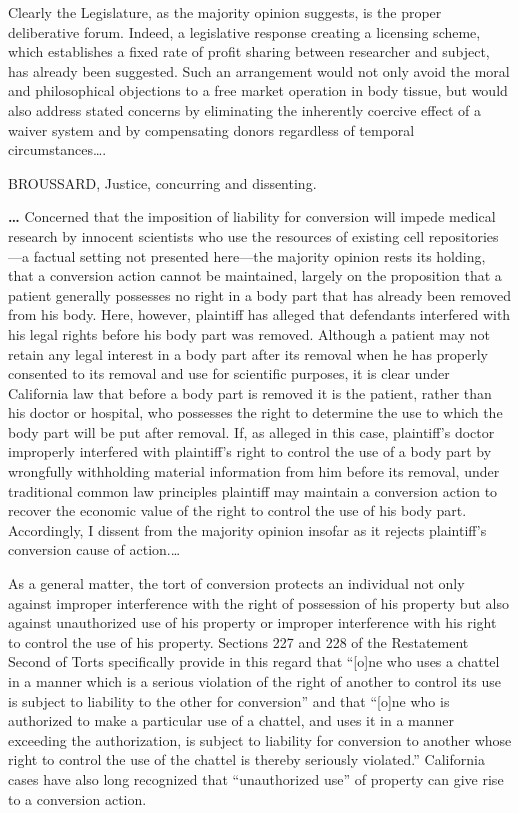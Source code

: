 Clearly the Legislature, as the majority opinion suggests, is the proper
deliberative forum. Indeed, a legislative response creating a licensing scheme,
which establishes a fixed rate of profit sharing between researcher and
subject, has already been suggested. Such an arrangement would not only avoid
the moral and philosophical objections to a free market operation in body
tissue, but would also address stated concerns by eliminating the inherently
coercive effect of a waiver system and by compensating donors regardless of
temporal circumstances{\dots}.

BROUSSARD, Justice, concurring and dissenting.

\textbf{{\dots} }Concerned that the imposition of liability for conversion will
impede medical research by innocent scientists who use the resources of
existing cell repositories---a factual setting not presented here---the
majority opinion rests its holding, that a conversion action cannot be
maintained, largely on the proposition that a patient generally possesses no
right in a body part that has already been removed from his body. Here,
however, plaintiff has alleged that defendants interfered with his legal rights
before his body part was removed. Although a patient may not retain any legal
interest in a body part after its removal when he has properly consented to its
removal and use for scientific purposes, it is clear under California law that
before a body part is removed it is the patient, rather than his doctor or
hospital, who possesses the right to determine the use to which the body part
will be put after removal. If, as alleged in this case, plaintiff's doctor
improperly interfered with plaintiff's right to control the use of a body part
by wrongfully withholding material information from him before its removal,
under traditional common law principles plaintiff may maintain a conversion
action to recover the economic value of the right to control the use of his
body part. Accordingly, I dissent from the majority opinion insofar as it
rejects plaintiff's conversion cause of action.{\dots}

As a general matter, the tort of conversion protects an individual not only
against improper interference with the right of possession of his property but
also against unauthorized use of his property or improper interference with his
right to control the use of his property. Sections 227 and 228 of the
Restatement Second of Torts specifically provide in this regard that ``[o]ne
who uses a chattel in a manner which is a serious violation of the right of
another to control its use is subject to liability to the other for
conversion'' and that ``[o]ne who is authorized to make a particular use of a
chattel, and uses it in a manner exceeding the authorization, is subject to
liability for conversion to another whose right to control the use of the
chattel is thereby seriously violated.'' California cases have also long
recognized that ``unauthorized use'' of property can give rise to a conversion
action.

